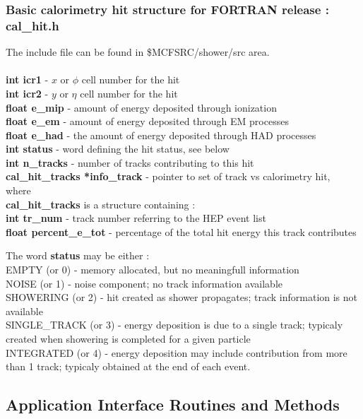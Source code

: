 \subsubsection
{Basic calorimetry hit structure for FORTRAN release : {\bf cal\_hit.h}}

The include file can be found in \$MCFSRC/shower/src area. \\
\\
{\bf int icr1} - $x$ or $\phi$ cell number for the hit \\
{\bf int icr2} - $y$ or $\eta$ cell number for the hit \\
{\bf float e\_mip} - amount of energy deposited through ionization \\
{\bf float e\_em} - amount of energy deposited through EM processes \\
{\bf float e\_had} - the amount of energy deposited through HAD processes \\
{\bf int status} - word defining the hit status, see below \\
{\bf int n\_tracks} - number of tracks contributing to this hit \\
{\bf cal\_hit\_tracks *info\_track} - pointer to set of track vs calorimetry 
hit, \\
where \\
{\bf cal\_hit\_tracks} is a structure containing : \\
{\bf int tr\_num} - track number referring to the HEP event list \\
{\bf float percent\_e\_tot} - percentage of the total hit energy this track 
contributes 

The word {\bf status} may be either : \\
EMPTY (or 0) - memory allocated, but no meaningfull information \\
NOISE (or 1) - noise component; no track information available \\
SHOWERING (or 2) - hit created as shower propagates; track information 
is not available \\
SINGLE\_TRACK (or 3) - energy deposition is due to a single track; typicaly 
created when showering is completed for a given particle \\
INTEGRATED (or 4) - energy  deposition may include contribution from more 
than 1 track;
typicaly obtained at the end of each event.

\subsection{Application Interface Routines and Methods}

